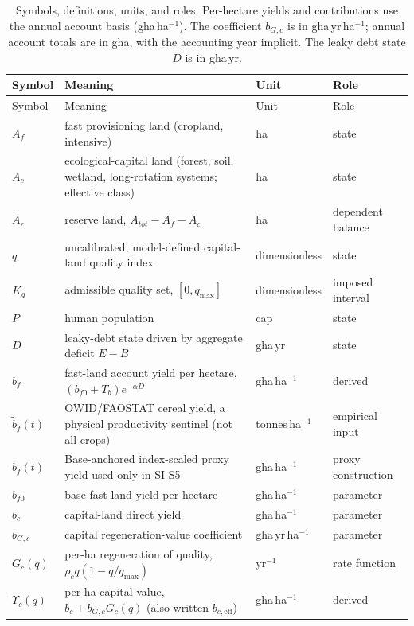 \documentclass[11pt,a4paper]{article}
\newcommand{\Ups}{\Upsilon_c}
\begin{document}
\begin{longtable}{>{\raggedright\arraybackslash}p{}>{\raggedright\arraybackslash}p{}>{\raggedright\arraybackslash}p{}>{\raggedright\arraybackslash}p{}}
\caption{Symbols, definitions, units, and roles. Per-hectare yields and contributions use the annual account basis (gha\,ha$^{-1}$). The coefficient $b_{G,c}$ is in gha\,yr\,ha$^{-1}$; annual account totals are in gha, with the accounting year implicit. The leaky debt state $D$ is in gha\,yr.}\label{tab:si_symbols}\\
\toprule
Symbol & Meaning & Unit & Role \\
\midrule
\endfirsthead
\toprule
Symbol & Meaning & Unit & Role \\
\midrule
\endhead
$A_f$ & fast provisioning land (cropland, intensive) & ha & state \\
$A_c$ & ecological-capital land (forest, soil, wetland, long-rotation systems; effective class) & ha & state \\
$A_r$ & reserve land, $A_{tot}-A_f-A_c$ & ha & dependent balance \\
$q$ & uncalibrated, model-defined capital-land quality index & dimensionless & state \\
$K_q$ & admissible quality set, $[0,q_{\max}]$ & dimensionless & imposed interval \\
$P$ & human population & cap & state \\
$D$ & leaky-debt state driven by aggregate deficit $E-B$ & gha\,yr & state \\
$b_f$ & fast-land account yield per hectare, $(b_{f0}+T_b)e^{-\alpha D}$ & gha\,ha$^{-1}$ & derived \\
$\tilde b_f(t)$ & OWID/FAOSTAT cereal yield, a physical productivity sentinel (not all crops) & tonnes\,ha$^{-1}$ & empirical input \\
$\hat b_f(t)$ & Base-anchored index-scaled proxy yield used only in SI S5 & gha\,ha$^{-1}$ & proxy construction \\
$b_{f0}$ & base fast-land yield per hectare & gha\,ha$^{-1}$ & parameter \\
$b_c$ & capital-land direct yield & gha\,ha$^{-1}$ & parameter \\
$b_{G,c}$ & capital regeneration-value coefficient & gha\,yr\,ha$^{-1}$ & parameter \\
$G_c(q)$ & per-ha regeneration of quality, $\rho_cq(1-q/q_{\max})$ & yr$^{-1}$ & rate function \\
$\Ups(q)$ & per-ha capital value, $b_c+b_{G,c}G_c(q)$ (also written $b_{c,\mathrm{eff}}$) & gha\,ha$^{-1}$ & derived \\

\end{longtable}
\end{document}
